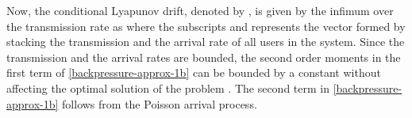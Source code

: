 Now, the conditional Lyapunov drift, denoted by , is given by the infimum over the transmission rate as
\iftoggle{single_column}{
\begin{IEEEeqnarray}{rCl} \label{backpressure-approx}
	\underset{\mbf{t}}{\text{inf}} &\quad& \Delta(\mbf{Q}(i)) \triangleq \mathbb{E}_{\mbfa{\lambda},\mbf{t}} \set{\mathrm{L}\sset{\mbf{Q}(i+1)} - \mathrm{L}\sset{\mbf{Q}(i)} \vert \mbf{Q}(i)} \IEEEyessubnumber \\
	&\leq& \underbrace{\mathbb{E}_{\mbfa{\lambda},\mbf{t}} \set {\sum_{k \in \mc{U}} \, \frac{\lambda^2_k(i) + t_k^2(i)}{2} \vert \mbf{Q}(i)}}_{\le B} + \sum_{k \in \mc{U}} Q_k(i) A_k(i) - \mathbb{E}_{\mbfa{\lambda},\mbf{t}}\set{\sum_{k \in \mc{U}} Q_k(i) t_k(i)  \vert \mbf{Q}(i)}, \eqsub \label{backpressure-approx-1b}
\end{IEEEeqnarray}}{
\begin{IEEEeqnarray}{CL} \label{backpressure-approx}
	\underset{\mbf{t}}{\text{inf}} \quad & \mathbb{E}_{\mbfa{\lambda},\mbf{t}} \set{\mathrm{L}\sset{\mbf{Q}(i+1)} - \mathrm{L}\sset{\mbf{Q}(i)} \vert \mbf{Q}(i)} \IEEEyessubnumber \\
	\leq & \underbrace{\mathbb{E}_{\mbfa{\lambda},\mbf{t}} \Big \lbrace \sum_{k \in \mc{U}} \frac{\lambda^2_k(i) + t_k^2(i)}{2} \vert \mbf{Q}(i) \Big \rbrace }_{\le B} + \sum_{k \in \mc{U}} Q_k(i) A_k(i) \nonumber \\
	& \qquad \qquad {} - \mathbb{E}_{\mbfa{\lambda},\mbf{t}}\Big \lbrace \sum_{k \in \mc{U}} Q_k(i) t_k(i)  \vert \mbf{Q}(i) \Big \rbrace, \eqsub \label{backpressure-approx-1b}
\end{IEEEeqnarray}}
where the subscripts  and \me{\mbfa{\lambda}} represents the vector formed by stacking the transmission and the arrival rate of all users in the system. Since the transmission and the arrival rates are bounded, the second order moments in the first term of \eqref{backpressure-approx-1b} can be bounded by a constant  without affecting the optimal solution of the problem \cite{neely2010stochastic}. The second term in \eqref{backpressure-approx-1b} follows from the Poisson arrival process.

